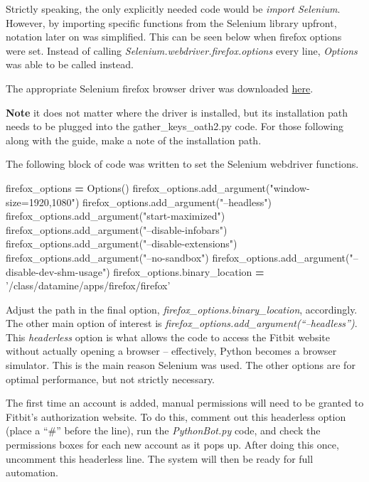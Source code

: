 \documentclass[]{book}
\newenvironment{Shaded}{\begin{snugshade}}{\end{snugshade}}
\newcommand{\StringTok}[1]{\textcolor[rgb]{0.31,0.60,0.02}{#1}}
\newcommand{\OperatorTok}[1]{\textcolor[rgb]{0.81,0.36,0.00}{\textbf{#1}}}
\newcommand{\NormalTok}[1]{#1}
\begin{document}
Strictly speaking, the only explicitly needed code would be \emph{import
Selenium}. However, by importing specific functions from the Selenium
library upfront, notation later on was simplified. This can be seen
below when firefox options were set. Instead of calling
\emph{Selenium.webdriver.firefox.options} every line, \emph{Options} was
able to be called instead.

The appropriate Selenium firefox browser driver was downloaded
\href{https://github.com/mozilla/geckodriver/releases}{here}.

\textbf{Note} it does not matter where the driver is installed, but its
installation path needs to be plugged into the gather\_keys\_oath2.py
code. For those following along with the guide, make a note of the
installation path.

The following block of code was written to set the Selenium webdriver
functions.

\begin{Shaded}
\begin{Highlighting}[]
\NormalTok{firefox_options }\OperatorTok{=}\NormalTok{ Options()}
\NormalTok{firefox_options.add_argument(}\StringTok{"window-size=1920,1080"}\NormalTok{)}
\NormalTok{firefox_options.add_argument(}\StringTok{"--headless"}\NormalTok{)}
\NormalTok{firefox_options.add_argument(}\StringTok{"start-maximized"}\NormalTok{)}
\NormalTok{firefox_options.add_argument(}\StringTok{"--disable-infobars"}\NormalTok{)}
\NormalTok{firefox_options.add_argument(}\StringTok{"--disable-extensions"}\NormalTok{)}
\NormalTok{firefox_options.add_argument(}\StringTok{"--no-sandbox"}\NormalTok{)}
\NormalTok{firefox_options.add_argument(}\StringTok{"--disable-dev-shm-usage"}\NormalTok{)}
\NormalTok{firefox_options.binary_location }\OperatorTok{=} \StringTok{'/class/datamine/apps/firefox/firefox'}
\end{Highlighting}
\end{Shaded}

Adjust the path in the final option,
\emph{firefox\_options.binary\_location}, accordingly. The other main
option of interest is
\emph{firefox\_options.add\_argument(``--headless'')}. This
\emph{headerless} option is what allows the code to access the Fitbit
website without actually opening a browser -- effectively, Python
becomes a browser simulator. This is the main reason Selenium was used.
The other options are for optimal performance, but not strictly
necessary.

The first time an account is added, manual permissions will need to be
granted to Fitbit's authorization website. To do this, comment out this
headerless option (place a ``\#'' before the line), run the
\emph{PythonBot.py} code, and check the permissions boxes for each new
account as it pops up. After doing this once, uncomment this headerless
line. The system will then be ready for full automation.
\end{document}
